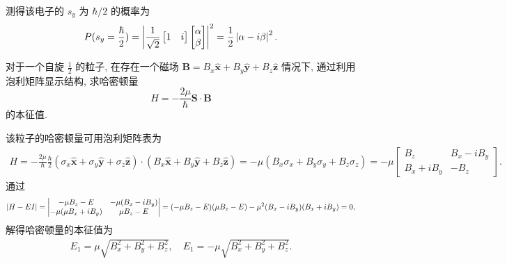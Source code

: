\documentclass{assignment}
\begin{document}
\begin{sol}
    测得该电子的 $s_y$ 为 $\hbar/2$ 的概率为
    \begin{align}
        P(s_y=\frac{\hbar}{2})=\left\lvert\frac{1}{\sqrt{2}}\begin{bmatrix}
            1&i
        \end{bmatrix}\begin{bmatrix}
            \alpha\\
            \beta
        \end{bmatrix}\right\rvert^2=\frac{1}{2}\left\lvert\alpha-i\beta\right\rvert^2.
    \end{align}
\end{sol}

\begin{prob}[课本习题 3.2]
    对于一个自旋 $\frac{1}{2}$ 的粒子, 在存在一个磁场 $\bm{B}=B_x\hat{\bm{x}}+B_y\hat{\bm{y}}+B_z\hat{\bm{z}}$ 情况下, 通过利用泡利矩阵显示结构, 求哈密顿量
    \[
        H=-\frac{2\mu}{\hbar}\bm{S}\cdot\bm{B}
    \]
    的本征值.
\end{prob}
\begin{sol}
    该粒子的哈密顿量可用泡利矩阵表为
    \begin{align}
        H=-\frac{2\mu}{\hbar}\frac{\hbar}{2}(\sigma_x\hat{\bm{x}}+\sigma_y\hat{\bm{y}}+\sigma_z\hat{\bm{z}})\cdot(B_x\hat{\bm{x}}+B_y\hat{\bm{y}}+B_z\hat{\bm{z}})=-\mu(B_x\sigma_x+B_y\sigma_y+B_z\sigma_z)=-\mu\begin{bmatrix}
            B_z&B_x-iB_y\\
            B_x+iB_y&-B_z
        \end{bmatrix}.
    \end{align}
    通过
    \begin{align}
        \left\lvert H-EI\right\rvert=\begin{vmatrix}
            -\mu B_z-E&-\mu(B_x-iB_y)\\
            -\mu(\mu B_x+iB_y)&\mu B_z-E
        \end{vmatrix}=(-\mu B_z-E)(\mu B_z-E)-\mu^2(B_x-iB_y)(B_x+iB_y)=0,
    \end{align}
    解得哈密顿量的本征值为
    \begin{align}
        E_1=\mu\sqrt{B_x^2+B_y^2+B_z^2},\quad E_1=-\mu\sqrt{B_x^2+B_y^2+B_z^2}.
    \end{align}
\end{sol}
\end{document}
